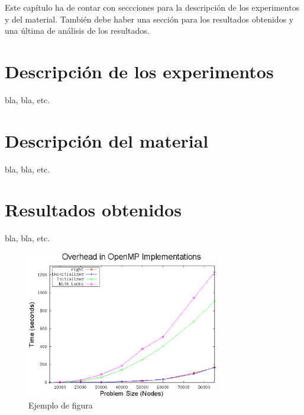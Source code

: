 
Este capítulo ha de contar con seccciones para la descripción de los experimentos 
y del material.
%
También debe haber una sección para los resultados obtenidos y una última de 
análisis de los resultados.

\section{Descripción de los experimentos}
\label{3:sec:1}

bla, bla, etc. 

\section{Descripción del material}
\label{3:sec:2}

bla, bla, etc. 


\section{Resultados obtenidos}
\label{3:sec:3}

bla, bla, etc. 


\begin{figure}[!th]
\begin{center}
\includegraphics[width=0.75\textwidth]{images/figura1.eps}
\caption{Ejemplo de figura}
\label{fig:1}
\end{center}
\end{figure}


